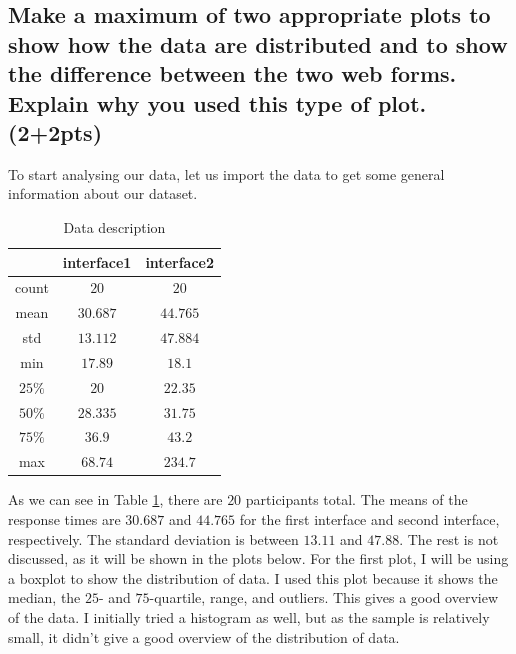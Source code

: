 \documentclass[a4paper]{article}
\begin{document}
\subsection{Make a maximum of two appropriate plots to show how the data are distributed and to show the difference between the two web forms. Explain why you used this type of plot. (2+2pts)}
To start analysing our data, let us import the data to get some general information about our dataset.
\begin{table}[H]
    \centering
    \begin{tabular}{|c|c|c|}
        \hline
         & interface1 & interface2\\
         \hline
         count & $20$ & $20$\\
         \hline
         mean & $30.687$ & $44.765$\\
         \hline
         std & $13.112$ & $47.884$\\
         \hline
         min	& $17.89$ & $18.1$\\
         \hline
         $25\%$ & $20$ &	$22.35$\\
         \hline
         $50\%$ & $28.335$ & $31.75$\\
         \hline
         $75\%$ & $36.9$ & $43.2$\\
         \hline
         max & $68.74$ & $234.7$\\
         \hline
    \end{tabular}
    \caption{Data description}
    \label{tab:q1description}
\end{table}
As we can see in Table \ref{tab:q1description}, there are $20$ participants total. The means of the response times are $30.687$ and $44.765$ for the first interface and second interface, respectively. The standard deviation is between $13.11$ and $47.88$. The rest is not discussed, as it will be shown in the plots below.\newline\newline
For the first plot, I will be using a boxplot to show the distribution of data. I used this plot because it shows the median, the $25$- and $75$-quartile, range, and outliers. This gives a good overview of the data. I initially tried a histogram as well, but as the sample is relatively small, it didn't give a good overview of the distribution of data.
\end{document}
